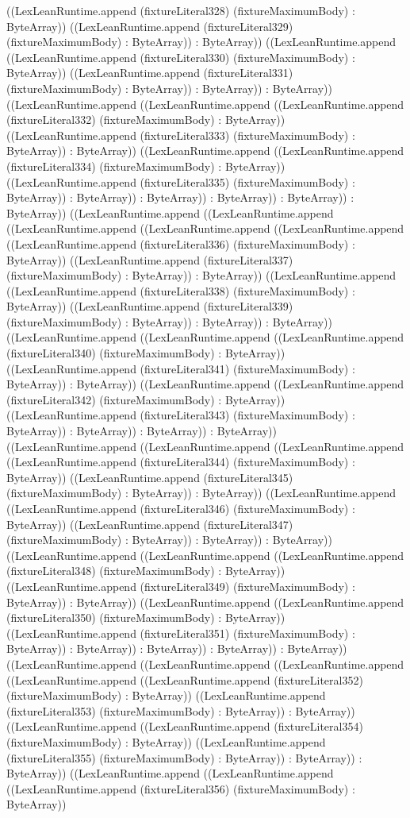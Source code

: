 \documentclass[11pt]{article}
\begin{document}
((LexLeanRuntime.append (fixtureLiteral328) (fixtureMaximumBody) : ByteArray)) ((LexLeanRuntime.append (fixtureLiteral329) (fixtureMaximumBody) : ByteArray)) : ByteArray)) ((LexLeanRuntime.append ((LexLeanRuntime.append (fixtureLiteral330) (fixtureMaximumBody) : ByteArray)) ((LexLeanRuntime.append (fixtureLiteral331) (fixtureMaximumBody) : ByteArray)) : ByteArray)) : ByteArray)) ((LexLeanRuntime.append ((LexLeanRuntime.append ((LexLeanRuntime.append (fixtureLiteral332) (fixtureMaximumBody) : ByteArray)) ((LexLeanRuntime.append (fixtureLiteral333) (fixtureMaximumBody) : ByteArray)) : ByteArray)) ((LexLeanRuntime.append ((LexLeanRuntime.append (fixtureLiteral334) (fixtureMaximumBody) : ByteArray)) ((LexLeanRuntime.append (fixtureLiteral335) (fixtureMaximumBody) : ByteArray)) : ByteArray)) : ByteArray)) : ByteArray)) : ByteArray)) : ByteArray)) ((LexLeanRuntime.append ((LexLeanRuntime.append ((LexLeanRuntime.append ((LexLeanRuntime.append ((LexLeanRuntime.append ((LexLeanRuntime.append (fixtureLiteral336) (fixtureMaximumBody) : ByteArray)) ((LexLeanRuntime.append (fixtureLiteral337) (fixtureMaximumBody) : ByteArray)) : ByteArray)) ((LexLeanRuntime.append ((LexLeanRuntime.append (fixtureLiteral338) (fixtureMaximumBody) : ByteArray)) ((LexLeanRuntime.append (fixtureLiteral339) (fixtureMaximumBody) : ByteArray)) : ByteArray)) : ByteArray)) ((LexLeanRuntime.append ((LexLeanRuntime.append ((LexLeanRuntime.append (fixtureLiteral340) (fixtureMaximumBody) : ByteArray)) ((LexLeanRuntime.append (fixtureLiteral341) (fixtureMaximumBody) : ByteArray)) : ByteArray)) ((LexLeanRuntime.append ((LexLeanRuntime.append (fixtureLiteral342) (fixtureMaximumBody) : ByteArray)) ((LexLeanRuntime.append (fixtureLiteral343) (fixtureMaximumBody) : ByteArray)) : ByteArray)) : ByteArray)) : ByteArray)) ((LexLeanRuntime.append ((LexLeanRuntime.append ((LexLeanRuntime.append ((LexLeanRuntime.append (fixtureLiteral344) (fixtureMaximumBody) : ByteArray)) ((LexLeanRuntime.append (fixtureLiteral345) (fixtureMaximumBody) : ByteArray)) : ByteArray)) ((LexLeanRuntime.append ((LexLeanRuntime.append (fixtureLiteral346) (fixtureMaximumBody) : ByteArray)) ((LexLeanRuntime.append (fixtureLiteral347) (fixtureMaximumBody) : ByteArray)) : ByteArray)) : ByteArray)) ((LexLeanRuntime.append ((LexLeanRuntime.append ((LexLeanRuntime.append (fixtureLiteral348) (fixtureMaximumBody) : ByteArray)) ((LexLeanRuntime.append (fixtureLiteral349) (fixtureMaximumBody) : ByteArray)) : ByteArray)) ((LexLeanRuntime.append ((LexLeanRuntime.append (fixtureLiteral350) (fixtureMaximumBody) : ByteArray)) ((LexLeanRuntime.append (fixtureLiteral351) (fixtureMaximumBody) : ByteArray)) : ByteArray)) : ByteArray)) : ByteArray)) : ByteArray)) ((LexLeanRuntime.append ((LexLeanRuntime.append ((LexLeanRuntime.append ((LexLeanRuntime.append ((LexLeanRuntime.append (fixtureLiteral352) (fixtureMaximumBody) : ByteArray)) ((LexLeanRuntime.append (fixtureLiteral353) (fixtureMaximumBody) : ByteArray)) : ByteArray)) ((LexLeanRuntime.append ((LexLeanRuntime.append (fixtureLiteral354) (fixtureMaximumBody) : ByteArray)) ((LexLeanRuntime.append (fixtureLiteral355) (fixtureMaximumBody) : ByteArray)) : ByteArray)) : ByteArray)) ((LexLeanRuntime.append ((LexLeanRuntime.append ((LexLeanRuntime.append (fixtureLiteral356) (fixtureMaximumBody) : ByteArray)) 
\end{document}
